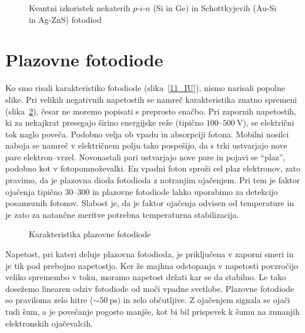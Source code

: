 \begin{figure}[ht]
\centering
\def\svgwidth{110truemm} 

\caption{Kvantni izkoristek nekaterih $p$-$i$-$n$ (Si in Ge) in Schottkyjevih (Au-Si in Ag-ZnS)
fotodiod}
\label{11_odziv}
\end{figure}

\section{Plazovne fotodiode}
Ko smo risali karakteristiko fotodiode (slika~\ref{11_IU}), 
nismo narisali popolne slike.
Pri velikih negativnih napetostih se namreč karakteristika znatno spremeni (slika~\ref{11_plaz}), 
česar ne moremo popisati s preprosto enačbo. Pri zapornih napetostih, ki za nekajkrat presegajo 
širino energijske reže (tipično $100$--$500~\si{\volt}$), 
se električni tok naglo poveča. Podobno velja ob vpadu in absorpciji fotona. 
Mobilni nosilci naboja se namreč v električnem polju tako pospešijo, da s trki ustvarjajo nove pare 
elektron--vrzel. Novonastali pari  ustvarjajo nove pare in pojavi se ``plaz'', podobno kot v 
fotopomnoževalki. En vpadni foton sproži cel plaz elektronov, zato pravimo, da je plazovna dioda
fotodioda z notranjim ojačenjem. Pri tem je faktor ojačenja tipično $30$--$300$ 
in plazovne fotodiode lahko 
uporabimo za detekcijo posameznih fotonov. Slabost je, da je faktor ojačenja odvisen od
temperature in je zato za natančne meritve potrebna temperaturna stabilizacija.
\begin{figure}[ht]
\centering
\def\svgwidth{60truemm} 

\caption{Karakteristika plazovne fotodiode}
\label{11_plaz}
\end{figure}

Napetost, pri kateri deluje plazovna fotodioda, je priključena v zaporni smeri 
in je tik pod prebojno napetostjo. Ker že  majhna odstopanja v napetosti povzročijo veliko
spremembo v toku, moramo napetost držati kar se da stabilno. Le tako dosežemo 
linearen odziv fotodiode od moči vpadne svetlobe. Plazovne fotodiode so praviloma zelo hitre 
($\sim 50~\si{\pico\second})$ in zelo občutljive. Z ojačenjem signala se ojači tudi šum, a je 
povečanje pogosto manjše, kot bi bil prispevek k šumu na zunanjih elektronskih ojačevalcih. 

